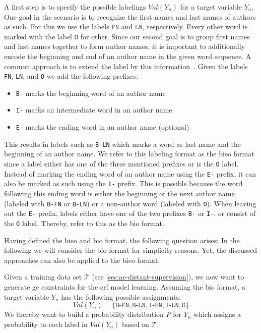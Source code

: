 A first step is to specify the possible labelings $Val(Y_n)$ for a \gls{target variable} $Y_n$.
One goal in the scenario is to recognize the first names and last names of authors as such.
For this we use the labels $\texttt{FN}$ and $\texttt{LN}$, respectively.
Every other word is marked with the label $\texttt{O}$ for other.
Since our second goal is to group first names and last names together to form author names, it is important to additionally encode the beginning and end of an author name in the given word sequence.
A common approach is to extend the label by this information~\citep{houngbo2012method}.
Given the labels \texttt{FN}, \texttt{LN}, and \texttt{O} we add the following prefixes:
\begin{itemize}
  \item \texttt{B-} marks the beginning word of an author name
  \item \texttt{I-} marks an intermediate word in an author name
  \item \texttt{E-} marks the ending word in an author name (optional)
\end{itemize}
This results in labels such as \texttt{B-LN} which marks a word as last name and the beginning of an author name.
We refer to this labeling format as the \acrfull{bieo} format since a label either has one of the three mentioned prefixes or is the \texttt{O} label.
Instead of marking the ending word of an author name using the \texttt{E-} prefix, it can also be marked as such using the \texttt{I-} prefix.
This is possible because the word following this ending word is either the beginning of the next author name (labeled with \texttt{B-FN} or \texttt{B-LN}) or a non-author word (labeled with \texttt{O}).
When leaving out the \texttt{E-} prefix, labels either have one of the two prefixes \texttt{B-} or \texttt{I-}, or consist of the \texttt{O} label.
Thereby, \citet{houngbo2012method} refer to this as the \acrfull{bio} format.

Having defined the \gls{bieo} and \gls{bio} format, the following question arises:
\researchquestiontwo%
In the following we will consider the \gls{bio} format for simplicity reasons.
Yet, the discussed approaches can also be applied to the \gls{bieo} format.

\bigskip

Given a training data set $\mathcal{T}$ (see \cref{sec:ae-distant-supervision}), we now want to generate \gls{ge} constraints for the \gls{crf} model learning.
Assuming the \gls{bio} format, a \gls{target variable} $Y_n$ has the following possible assignments:
\begin{equation*}
  Val(Y_n)=\{\texttt{B-FN},\texttt{B-LN},\texttt{I-FN},\texttt{I-LN},\texttt{O}\}
\end{equation*}
We thereby want to build a \gls{probability distribution} $P$ for $Y_n$ which assigns a probability to each label in $Val(Y_n)$ based on $\mathcal{T}$.

